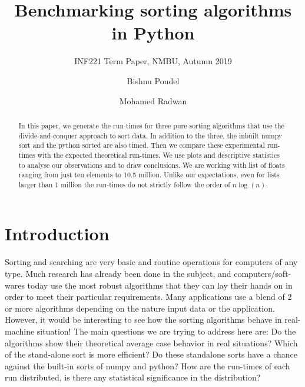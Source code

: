\documentclass[sigconf, nonacm, natbib, screen, balance=False]{acmart}
\begin{document}
\title{Benchmarking sorting algorithms in Python}
\subtitle{INF221 Term Paper, NMBU, Autumn 2019}

\author{Bishnu Poudel}

\author{Mohamed Radwan}

\begin{abstract}

In this paper, we generate the run-times for three pure sorting algorithms that use the divide-and-conquer approach to sort data. In addition to the three, the inbuilt numpy sort and the python sorted are also timed. Then we compare these experimental run-times with the expected theoretical run-times. We use plots and descriptive statistics to analyse our observations and to draw conclusions. We are working with list of floats ranging from just ten elements to 10.5 million. Unlike our expectations, even for lists larger than 1 million the run-times do not strictly follow the order of $n\log(n)$.
\end{abstract}
\maketitle
\section{Introduction}\label{sec:intro}

Sorting and searching are very basic and routine operations for computers of any type. Much research has already been done in the subject, and computers/soft-wares today use the most robust algorithms that they can lay their hands on in order to meet their particular requirements. Many applications use a blend of 2 or more algorithms depending on the nature input data or the application. However, it would be interesting to see how the  sorting algorithms behave in real-machine situation!\newline
\label{questions}The main questions we are trying to address here are: Do the algorithms show their theoretical average case behavior in real situations? Which of the stand-alone sort is more efficient? Do these standalone sorts have a chance against the built-in sorts of numpy and python? How are the run-times of each run distributed, is there any statistical significance in the distribution? 
\end{document}
